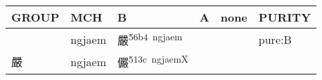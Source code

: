 \documentclass[14pt,a4paper]{scrartcl}
\begin{document}
\begin{longtable}[c]{@{}llllll@{}}
\toprule
\begin{minipage}[b]{0.14\columnwidth}\raggedright\strut
GROUP
\strut\end{minipage} &
\begin{minipage}[b]{0.14\columnwidth}\raggedright\strut
MCH
\strut\end{minipage} &
\begin{minipage}[b]{0.14\columnwidth}\raggedright\strut
B
\strut\end{minipage} &
\begin{minipage}[b]{0.14\columnwidth}\raggedright\strut
A
\strut\end{minipage} &
\begin{minipage}[b]{0.14\columnwidth}\raggedright\strut
none
\strut\end{minipage} &
\begin{minipage}[b]{0.14\columnwidth}\raggedright\strut
PURITY
\strut\end{minipage}\tabularnewline
\midrule
\endhead
\begin{minipage}[t]{0.14\columnwidth}\raggedright\strut
𠪘
\strut\end{minipage} &
\begin{minipage}[t]{0.14\columnwidth}\raggedright\strut
ngjaem
\strut\end{minipage} &
\begin{minipage}[t]{0.14\columnwidth}\raggedright\strut
嚴\textsuperscript{56b4~ngjaem}
\strut\end{minipage} &
\begin{minipage}[t]{0.14\columnwidth}\raggedright\strut
\strut\end{minipage} &
\begin{minipage}[t]{0.14\columnwidth}\raggedright\strut
\strut\end{minipage} &
\begin{minipage}[t]{0.14\columnwidth}\raggedright\strut
pure:B
\strut\end{minipage}\tabularnewline
\begin{minipage}[t]{0.14\columnwidth}\raggedright\strut
嚴
\strut\end{minipage} &
\begin{minipage}[t]{0.14\columnwidth}\raggedright\strut
ngjaem
\strut\end{minipage} &
\begin{minipage}[t]{0.14\columnwidth}\raggedright\strut
儼\textsuperscript{513c~ngjaemX}
\strut\end{minipage} &

\end{longtable}
\end{document}
